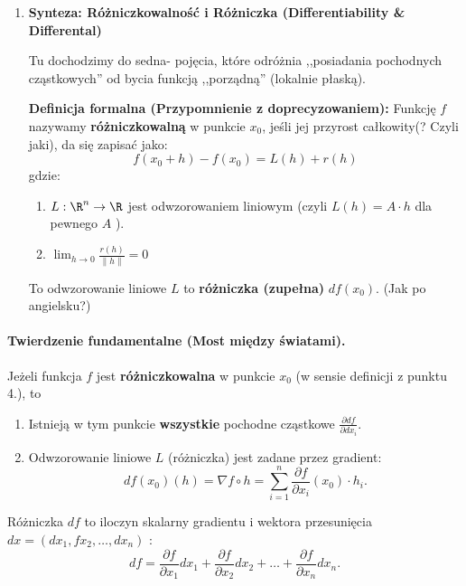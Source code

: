 \begin{enumerate}[label=\arabic*.]
		\textbf{Definicja formalna:} Gradientem funkcji $f$ w punkcie $x_0$ nazywamy wektor
		\[
			\nabla  f\left( x_0 \right) = \begin{bmatrix} \frac{\partial f}{\partial x_1}\left( x_0 \right) , \frac{\partial f}{\partial x_2} \left( x_0 \right) ,\ldots, \frac{\partial f}{\partial x_{n}}\left( x_0 \right)   \end{bmatrix} 
		.\] 
		Na tym etapie gradient to tylko worek z liczbami. Dopiero pojęcie różniczkowalności nada mu sens geometryczny.

	\item \textbf{Synteza: Różniczkowalność i Różniczka (Differentiability \& Differental)} 
		
	Tu dochodzimy do sedna- pojęcia, które odróżnia ,,posiadania pochodnych cząstkowych'' od bycia funkcją ,,porządną'' (lokalnie płaską).

	\textbf{Definicja formalna (Przypomnienie z doprecyzowaniem):} Funkcję $f$ nazywamy \textbf{różniczkowalną} w punkcie $x_0$, jeśli jej przyrost całkowity(? Czyli jaki), da się zapisać jako:
	\[
	f\left( x_0 + h \right) - f\left( x_0 \right) = L\left( h \right) + r\left( h \right) 
	\] 
	gdzie:

	\begin{enumerate}[label=\alph*)]
		\item $L : \R^{n}\to\R$ jest odwzorowaniem liniowym (czyli $L\left( h \right) = A\cdot h$ dla pewnego $A$ ).
		\item $\lim_{h \to 0} \frac{r\left( h \right)}{\|h\|}=0$
	\end{enumerate}

	To odwzorowanie liniowe $L$ to \textbf{różniczka (zupełna)} $df\left( x_0 \right) $. (Jak po angielsku?)
\end{enumerate}
\paragraph{Twierdzenie fundamentalne (Most między światami).}

\begin{theorem}[Most]
	Jeżeli funkcja $f$ jest \textbf{różniczkowalna} w punkcie $x_0$ (w sensie definicji z punktu 4.), to
	\begin{enumerate}[label=\arabic*.]
		\item Istnieją w tym punkcie \textbf{wszystkie } pochodne cząstkowe $\frac{\partial df}{\partial dx_{i}} $.
		\item Odwzorowanie liniowe $L$ (różniczka) jest zadane przez gradient:
			\[
			df\left( x_0 \right) \left( h \right) = \nabla f \circ h = \sum_{i=1}^{n} \frac{\partial f}{\partial x_{i}}\left( x_{0} \right) \cdot h_{i}
			.\] 
	\end{enumerate}
\end{theorem} 
\begin{corollary}[Praktyczny]

	Różniczka $df$ to iloczyn skalarny gradientu i wektora przesunięcia  $dx = \left( dx_1, fx_2,\ldots,dx_{n} \right) $ :
	\[
	df = \frac{\partial f}{\partial x_1} dx_1 + \frac{\partial f}{\partial x_2} dx_2 + \ldots + \frac{\partial f}{\partial x_{n}}dx_{n} 
	.\] 
\end{corollary}
